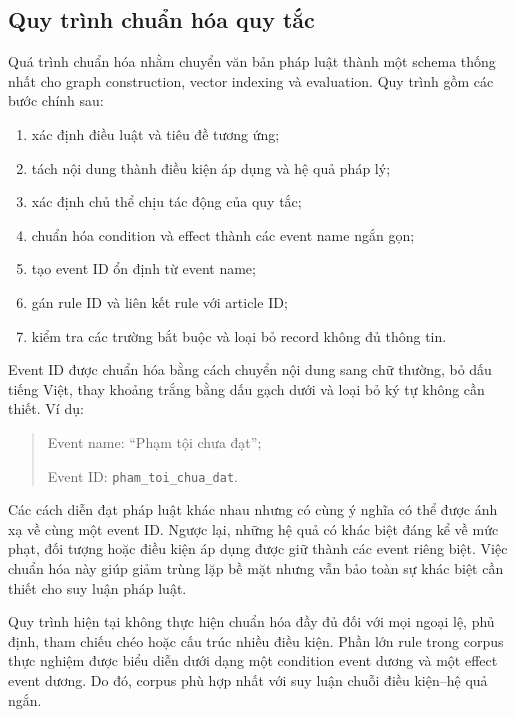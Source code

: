 \subsection{Quy trình chuẩn hóa quy tắc}

Quá trình chuẩn hóa nhằm chuyển văn bản pháp luật thành một schema thống
nhất cho graph construction, vector indexing và evaluation. Quy trình gồm
các bước chính sau:

\begin{enumerate}
    \item xác định điều luật và tiêu đề tương ứng;

    \item tách nội dung thành điều kiện áp dụng và hệ quả pháp lý;

    \item xác định chủ thể chịu tác động của quy tắc;

    \item chuẩn hóa condition và effect thành các event name ngắn gọn;

    \item tạo event ID ổn định từ event name;

    \item gán rule ID và liên kết rule với article ID;

    \item kiểm tra các trường bắt buộc và loại bỏ record không đủ thông tin.
\end{enumerate}

Event ID được chuẩn hóa bằng cách chuyển nội dung sang chữ thường, bỏ dấu
tiếng Việt, thay khoảng trắng bằng dấu gạch dưới và loại bỏ ký tự không cần
thiết. Ví dụ:

\begin{quote}
Event name: ``Phạm tội chưa đạt'';

Event ID: \texttt{pham\_toi\_chua\_dat}.
\end{quote}

Các cách diễn đạt pháp luật khác nhau nhưng có cùng ý nghĩa có thể được ánh
xạ về cùng một event ID. Ngược lại, những hệ quả có khác biệt đáng kể về mức
phạt, đối tượng hoặc điều kiện áp dụng được giữ thành các event riêng biệt.
Việc chuẩn hóa này giúp giảm trùng lặp bề mặt nhưng vẫn bảo toàn sự khác biệt
cần thiết cho suy luận pháp luật.

Quy trình hiện tại không thực hiện chuẩn hóa đầy đủ đối với mọi ngoại lệ,
phủ định, tham chiếu chéo hoặc cấu trúc nhiều điều kiện. Phần lớn rule trong
corpus thực nghiệm được biểu diễn dưới dạng một condition event dương và một
effect event dương. Do đó, corpus phù hợp nhất với suy luận chuỗi điều
kiện--hệ quả ngắn.

